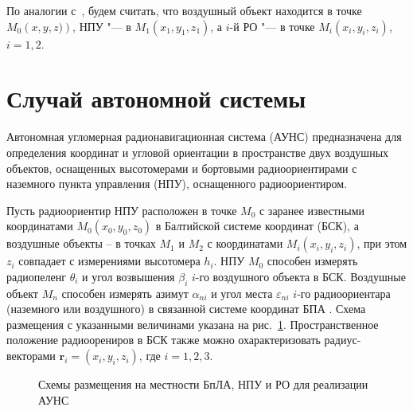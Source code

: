 \documentclass[a4paper,12pt]{article}
\begin{document}
По аналогии с~\cite{antennas}, будем считать, что воздушный объект находится в точке $M_0\left(x, y, z)\right)$,
НПУ "--- в $M_1\left(x_1, y_1, z_1\right)$, а $i$-й РО "--- в точке $M_i\left(x_i, y_i, z_i \right)$, $i = 1,2$.



\section{Случай автономной системы}
Автономная угломерная радионавигационная система (АУНС) предназначена для определения
координат и угловой ориентации в пространстве двух воздушных объектов, оснащенных
высотомерами и бортовыми радиоориентирами с наземного пункта управления (НПУ),
оснащенного радиоориентиром.

Пусть радиоориентир НПУ расположен в точке $M_0$ с заранее известными координатами
$M_0\left(x_0, y_0, z_0\right)$ в Балтийской системе координат (БСК), а воздушные объекты
-- в точках $M_1$ и $M_2$ с координатами $M_i\left(x_i, y_i, z_i\right)$, при этом $z_i$
совпадает с измерениями высотомера $h_i$. НПУ $M_0$ способен измерять радиопеленг $\theta_i$
и угол возвышения $\beta_i$ $i$-го воздушного объекта в БСК. Воздушные объект $M_n$
способен измерять азимут $\alpha_{ni}$ и угол места $\varepsilon_{ni}$ $i$-го
радиоориентара (наземного или воздушного) в связанной системе координат БПА \cite{antennas}.
Схема размещения с указанными величинами указана на рис.~\ref{figure:pic3}.
Пространственное положение радиоорениров в БСК также можно охарактеризовать радиус-векторами
$\mathbf{r}_i = \left(x_i, y_i, z_i\right)$, где $i = 1,2,3$.

\begin{figure}[htbp]
    \begin{center}


    \caption{Схемы размещения на местности БпЛА, НПУ и РО для реализации АУНС}
    \label{figure:pic3}
    \end{center}
\end{figure}
\end{document}
